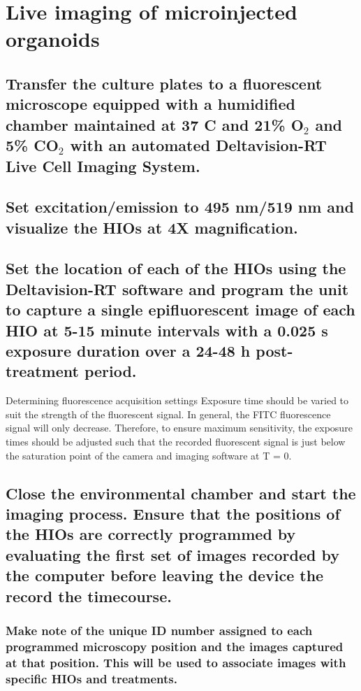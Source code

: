 \documentclass[11pt]{article}
\begin{document}
\section{{\sffamily } Live imaging of microinjected organoids}
\label{sec:orgheadline68}
\subsection{{\sffamily } Transfer the culture plates to a fluorescent microscope equipped with a humidified chamber maintained at 37 \textdegree{}C and 21\% O\(_{\text{2}}\) and 5\% CO\(_{\text{2}}\) with an automated Deltavision-RT Live Cell Imaging System.}
\label{sec:orgheadline61}

\subsection{{\sffamily } Set excitation/emission to 495 nm/519 nm and visualize the HIOs at 4X magnification.}
\label{sec:orgheadline62}
\subsection{{\sffamily } Set the location of each of the HIOs using the Deltavision-RT software and program the unit to capture a single epifluorescent image of each HIO at 5-15 minute intervals with a 0.025 s exposure duration over a 24-48 h post-treatment period.}
\label{sec:orgheadline63}
\begin{bclogo}[logo=\bcinfo, couleurBarre=Black, noborder=true, couleur=gray!10]{     Determining fluorescence acquisition settings}
Exposure time should be varied to suit the strength of the fluorescent signal. In general, the FITC fluorescence signal will only decrease. Therefore, to ensure maximum sensitivity, the exposure times should be adjusted such that the recorded fluorescent signal is just below the saturation point of the camera and imaging software at T = 0.\\
\end{bclogo}

\subsection{{\sffamily } Close the environmental chamber and start the imaging process. Ensure that the positions of the HIOs are correctly programmed by evaluating the first set of images recorded by the computer before leaving the device the record the timecourse.}
\label{sec:orgheadline65}
\subsubsection{{\sffamily } Make note of the unique ID number assigned to each programmed microscopy position and the images captured at that position. This will be used to associate images with specific HIOs and treatments.}
\label{sec:orgheadline64}
\end{document}
